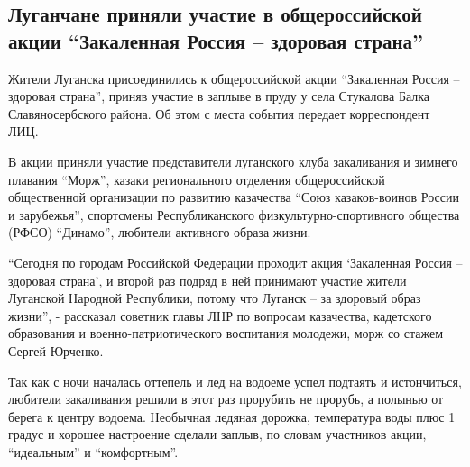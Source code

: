  
 
 
 
 
\subsection{Луганчане приняли участие в общероссийской акции \enquote{Закаленная Россия – здоровая страна}}
\label{sec:25_12_2021.stz.news.lnr.lug_info.1.zakalennaja_rossia}


Жители Луганска присоединились к общероссийской акции \enquote{Закаленная Россия –
здоровая страна}, приняв участие в заплыве в пруду у села Стукалова Балка
Славяносербского района. Об этом с места события передает корреспондент ЛИЦ.


В акции приняли участие представители луганского клуба закаливания и зимнего
плавания \enquote{Морж}, казаки регионального отделения общероссийской общественной
организации по развитию казачества \enquote{Союз казаков-воинов России и зарубежья},
спортсмены Республиканского физкультурно-спортивного общества (РФСО) \enquote{Динамо},
любители активного образа жизни.


\enquote{Сегодня по городам Российской Федерации проходит акция
\enquote{Закаленная Россия – здоровая страна}, и второй раз подряд в ней
принимают участие жители Луганской Народной Республики, потому что Луганск – за
здоровый образ жизни}, - рассказал советник главы ЛНР по вопросам казачества,
кадетского образования и военно-патриотического воспитания молодежи, морж со
стажем Сергей Юрченко.


Так как с ночи началась оттепель и лед на водоеме успел подтаять и истончиться,
любители закаливания решили в этот раз прорубить не прорубь, а полынью от
берега к центру водоема. Необычная ледяная дорожка, температура воды плюс 1
градус и хорошее настроение сделали заплыв, по словам участников акции,
\enquote{идеальным} и \enquote{комфортным}.

